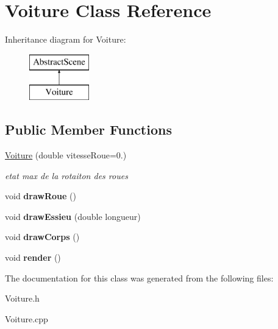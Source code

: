 \hypertarget{classVoiture}{}\section{Voiture Class Reference}
\label{classVoiture}
Inheritance diagram for Voiture\+:\begin{figure}[H]
\begin{center}
\leavevmode
\includegraphics[height=2.000000cm]{classVoiture}
\end{center}
\end{figure}
\subsection*{Public Member Functions}
\begin{DoxyCompactItemize}
\item 
\mbox{\label{classVoiture_a566a3faabc5c390003fa46988e5928a1}} 
\mbox{\hyperlink{classVoiture_a566a3faabc5c390003fa46988e5928a1}{Voiture}} (double vitesse\+Roue=0.)
\begin{DoxyCompactList}\small\item\em etat max de la rotaiton des roues \end{DoxyCompactList}\item 
\mbox{\label{classVoiture_a6232a9043c077a4f69e92b90566d9b78}} 
void {\bfseries draw\+Roue} ()
\item 
\mbox{\label{classVoiture_ab94ee125473d3b3d2b017e83e8be6f3f}} 
void {\bfseries draw\+Essieu} (double longueur)
\item 
\mbox{\label{classVoiture_a7fa87c8502621808711285bf09c4b82e}} 
void {\bfseries draw\+Corps} ()
\item 
\mbox{\label{classVoiture_a4abe5b41fc48c9cbdd0da7780dcd9a53}} 
void {\bfseries render} ()
\end{DoxyCompactItemize}


The documentation for this class was generated from the following files\+:\begin{DoxyCompactItemize}
\item 
Voiture.\+h\item 
Voiture.\+cpp\end{DoxyCompactItemize}
